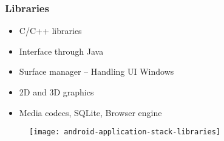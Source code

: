 %
%


\begin{frame}
  \frametitle{Libraries}
  
  \begin{itemize}
  \item<1-> C/C++ libraries
  \item<2-> Interface through Java
  \item<3-> Surface manager -- Handling UI Windows
  \item<4-> 2D and 3D graphics
  \item<5-> Media codecs, SQLite, Browser engine
  \end{itemize}

  \begin{figure}
    \centering
    \texttt{[image: android-application-stack-libraries]}
  \end{figure}


\end{frame}


